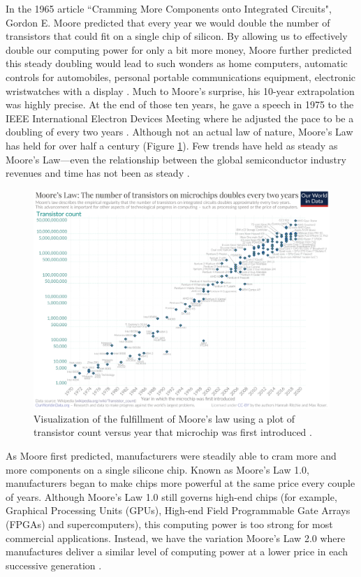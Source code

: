 \documentclass{article}
\begin{document}
In the 1965 article ``Cramming More Components onto Integrated Circuits", Gordon E. Moore predicted that every year we would double the number of transistors that could fit on a single chip of silicon. By allowing us to effectively double our computing power for only a bit more money, Moore further predicted this steady doubling would lead to such wonders as home computers, automatic controls for automobiles, personal portable communications equipment, electronic wristwatches with a display \cite{moore1998cramming}. Much to Moore's surprise, his 10-year extrapolation was highly precise. At the end of those ten years, he gave a speech in 1975 to the IEEE International Electron Devices Meeting where he adjusted the pace to be a doubling of every two years \cite{moore2006moore}. Although not an actual law of nature, Moore's Law has held for over half a century (Figure \ref{Moores_Law_Transistor_Count}). Few trends have held as steady as Moore's Law—even the relationship between the global semiconductor industry revenues and time has not been as steady \cite{moore2006moore}.

\begin{figure}[h]
    \includegraphics[width=.95 \textwidth]{./images_moores/Moores_Law_Transistor_Count.png}
    \centering
    \caption{Visualization of the fulfillment of Moore's law using a plot of transistor count versus year that microchip was first introduced \cite{owid2020technologicalprogress}.}
    \label{Moores_Law_Transistor_Count}
\end{figure}

 
As Moore first predicted, manufacturers were steadily able to cram more and more components on a single silicone chip. Known as Moore's Law 1.0, manufacturers began to make chips more powerful at the same price every couple of years. Although Moore's Law 1.0 still governs high-end chips (for example, Graphical Processing Units (GPUs), High-end Field Programmable Gate Arrays (FPGAs) and supercomputers), this computing power is too strong for most commercial applications. Instead, we have the variation Moore's Law 2.0 where manufactures deliver a similar level of computing power at a lower price in each successive generation \cite{peper2017end}.
\end{document}

